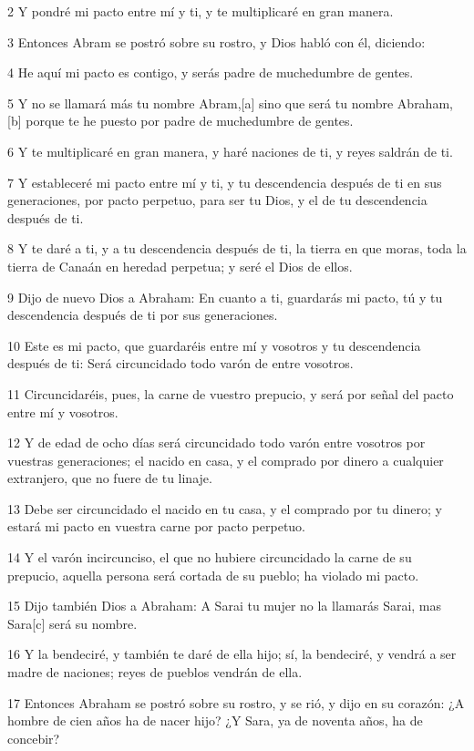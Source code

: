 2 Y pondré mi pacto entre mí y ti, y te multiplicaré en gran manera.

3 Entonces Abram se postró sobre su rostro, y Dios habló con él, diciendo:

4 He aquí mi pacto es contigo, y serás padre de muchedumbre de gentes.

5 Y no se llamará más tu nombre Abram,[a] sino que será tu nombre Abraham,[b] porque te he puesto por padre de muchedumbre de gentes.

6 Y te multiplicaré en gran manera, y haré naciones de ti, y reyes saldrán de ti.

7 Y estableceré mi pacto entre mí y ti, y tu descendencia después de ti en sus generaciones, por pacto perpetuo, para ser tu Dios, y el de tu descendencia después de ti.

8 Y te daré a ti, y a tu descendencia después de ti, la tierra en que moras, toda la tierra de Canaán en heredad perpetua; y seré el Dios de ellos.

9 Dijo de nuevo Dios a Abraham: En cuanto a ti, guardarás mi pacto, tú y tu descendencia después de ti por sus generaciones.

10 Este es mi pacto, que guardaréis entre mí y vosotros y tu descendencia después de ti: Será circuncidado todo varón de entre vosotros.

11 Circuncidaréis, pues, la carne de vuestro prepucio, y será por señal del pacto entre mí y vosotros.

12 Y de edad de ocho días será circuncidado todo varón entre vosotros por vuestras generaciones; el nacido en casa, y el comprado por dinero a cualquier extranjero, que no fuere de tu linaje.

13 Debe ser circuncidado el nacido en tu casa, y el comprado por tu dinero; y estará mi pacto en vuestra carne por pacto perpetuo.

14 Y el varón incircunciso, el que no hubiere circuncidado la carne de su prepucio, aquella persona será cortada de su pueblo; ha violado mi pacto.

15 Dijo también Dios a Abraham: A Sarai tu mujer no la llamarás Sarai, mas Sara[c] será su nombre.

16 Y la bendeciré, y también te daré de ella hijo; sí, la bendeciré, y vendrá a ser madre de naciones; reyes de pueblos vendrán de ella.

17 Entonces Abraham se postró sobre su rostro, y se rió, y dijo en su corazón: ¿A hombre de cien años ha de nacer hijo? ¿Y Sara, ya de noventa años, ha de concebir?

